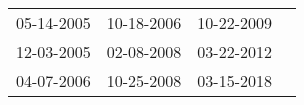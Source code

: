 \begin{supertabular}{llll}
 05-14-2005 &  10-18-2006 &  10-22-2009 \\
 12-03-2005 &  02-08-2008 &  03-22-2012 \\
 04-07-2006 &  10-25-2008 &  03-15-2018 \\
\end{supertabular}
